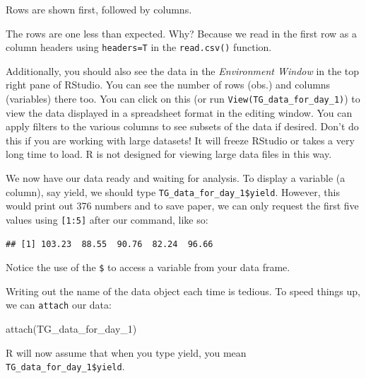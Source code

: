 \documentclass[
]{book}
\makeatletter
\newenvironment{Shaded}{\begin{snugshade}}{\end{snugshade}}
\newcommand{\DecValTok}[1]{\textcolor[rgb]{0.00,0.00,0.81}{#1}}
\newcommand{\FunctionTok}[1]{\textcolor[rgb]{0.00,0.00,0.00}{#1}}
\newcommand{\NormalTok}[1]{#1}
\newcommand{\SpecialCharTok}[1]{\textcolor[rgb]{0.00,0.00,0.00}{#1}}
\newenvironment{kframe}{%
\medskip{}
\setlength{\fboxsep}{.8em}
 \def\at@end@of@kframe{}%
 \ifinner\ifhmode%
  \def\at@end@of@kframe{\end{minipage}}%
  \begin{minipage}{\columnwidth}%
 \fi\fi%
 \def\FrameCommand##1{\hskip\@totalleftmargin \hskip-\fboxsep
 \colorbox{shadecolor}{##1}\hskip-\fboxsep
     \hskip-\linewidth \hskip-\@totalleftmargin \hskip\columnwidth}%
 \MakeFramed {\advance\hsize-\width
   \@totalleftmargin\z@ \linewidth\hsize
   \@setminipage}}%
 {\par\unskip\endMakeFramed%
 \at@end@of@kframe}
\newenvironment{rmdblock}[1]
  {
  \begin{itemize}
  \renewcommand{\labelitemi}{
    \raisebox{-.7\height}[0pt][0pt]{
      {\setkeys{Gin}{width=3em,keepaspectratio}\texttt{[image: images/\#1]}}
    }
  }
  \setlength{\fboxsep}{1em}
  \begin{kframe}
  \item
  }
  {
  \end{kframe}
  \end{itemize}
  }
\newenvironment{rmdcaution}
  {\begin{rmdblock}{caution}}
  {\end{rmdblock}}
\makeatother
\begin{document}
Rows are shown first, followed by columns.

\begin{rmdcaution}
The rows are one less than expected. Why? Because we read in the first row as a column headers using \texttt{headers=T} in the \texttt{read.csv()} function.
\end{rmdcaution}

Additionally, you should also see the data in the \emph{Environment Window} in the top right pane of RStudio. You can see the number of rows (obs.) and columns (variables) there too. You can click on this (or run \texttt{View(TG\_data\_for\_day\_1)}) to view the data displayed in a spreadsheet format in the editing window. You can apply filters to the various columns to see subsets of the data if desired. Don't do this if you are working with large datasets! It will freeze RStudio or takes a very long time to load. R is not designed for viewing large data files in this way.

We now have our data ready and waiting for analysis. To display a variable (a column), say yield, we should type \texttt{TG\_data\_for\_day\_1\$yield}. However, this would print out 376 numbers and to save paper, we can only request the first five values using \texttt{{[}1:5{]}} after our command, like so:

\begin{Shaded}
\end{Shaded}

\begin{verbatim}
## [1] 103.23  88.55  90.76  82.24  96.66
\end{verbatim}

Notice the use of the \texttt{\$} to access a variable from your data frame.

Writing out the name of the data object each time is tedious. To speed things up, we can \texttt{attach} our data:

\begin{Shaded}
\begin{Highlighting}[]
\FunctionTok{attach}\NormalTok{(TG\_data\_for\_day\_1)}
\end{Highlighting}
\end{Shaded}

R will now assume that when you type yield, you mean \texttt{TG\_data\_for\_day\_1\$yield}.
\end{document}
